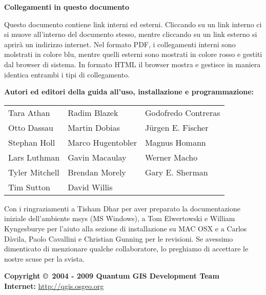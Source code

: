 \textbf{Collegamenti in questo documento}

Questo documento contiene link interni ed esterni. Cliccando su un
link interno ci si muove all'interno del documento stesso, mentre
cliccando su un link esterno si aprirà un indirizzo internet. Nel
formato PDF, i collegamenti interni sono molstrati in colore blu,
mentre quelli esterni sono mostrati in colore rosso e gestiti dal
browser di sistema. In formato HTML il browser mostra e gestisce in
maniera identica entrambi i tipi di collegamento.

\begin{flushleft}
\textbf{Autori ed editori della guida all'uso, installazione e programmazione:}
 
\begin{tabular}{p{5cm} p{5cm} p{5cm}}
Tara Athan & Radim Blazek & Godofredo Contreras \\
Otto Dassau & Martin Dobias & J\"urgen E. Fischer \\ 
Stephan Holl & Marco Hugentobler & Magnus Homann \\ 
Lars Luthman & Gavin Macaulay & Werner Macho \\
Tyler Mitchell & Brendan Morely & Gary E. Sherman \\ 
Tim Sutton & David Willis &  \\
\end{tabular}
\end{flushleft}

Con i ringraziamenti a Tisham Dhar per aver preparato la documentazione
iniziale dell'ambiente msys (MS Windows), a Tom Elwertowski e William
Kyngesburye per l'aiuto alla sezione di installazione su MAC OSX e
a Carlos Dàvila, Paolo Cavallini e Christian Gunning per le revisioni.
Se avessimo dimenticato di menzionare qualche collaboratore, lo preghiamo
di accettare le nostre scuse per la svista.

\textbf{Copyright \copyright~2004 - 2009 Quantum GIS Development Team} \\
\textbf{Internet:} \url{http://qgis.osgeo.org}


